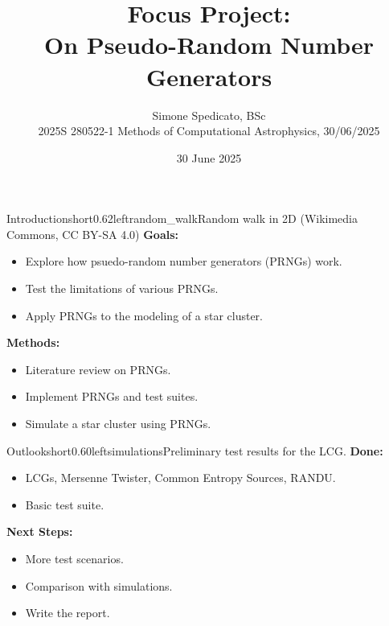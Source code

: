 \documentclass[hyperref={pdfpagelabels=false}, aspectratio=169, t]{beamer}  %
\title{Focus Project: \\ On Pseudo-Random Number Generators}											%
\subtitle{Simone Spedicato, BSc \\ 2025S 280522-1 Methods of Computational Astrophysics, 30/06/2025}                   					%
\date{30 June 2025}              									%
\begin{document}

\maketitle
											
													





\begin{graphicsFrame}{Introduction}{short}{0.62}{left}{random_walk}{Random walk in 2D (Wikimedia Commons, CC BY-SA 4.0)}
	\textbf{Goals:}
	\begin{itemize}
		\item Explore how psuedo-random number generators (PRNGs) work.
		\item Test the limitations of various PRNGs. 
		\item Apply PRNGs to the modeling of a star cluster.
	\end{itemize}
	\vspace{0.8em}
	\textbf{Methods:}
	\begin{itemize}
		\item Literature review on PRNGs.
		\item Implement PRNGs and test suites.
		\item Simulate a star cluster using PRNGs.
	\end{itemize}
\end{graphicsFrame}

\begin{graphicsFrame}{Outlook}{short}{0.60}{left}{simulations}{Preliminary test results for the LCG.}
	\textbf{Done:}
	\begin{itemize}
		\item LCGs, Mersenne Twister, Common Entropy Sources, RANDU.
		\item Basic test suite.
	\end{itemize}
	\vspace{0.8em}
	\textbf{Next Steps:}
	\begin{itemize}
		\item More test scenarios.
		\item Comparison with simulations.
		\item Write the report.
	\end{itemize}
\end{graphicsFrame}
\end{document}

